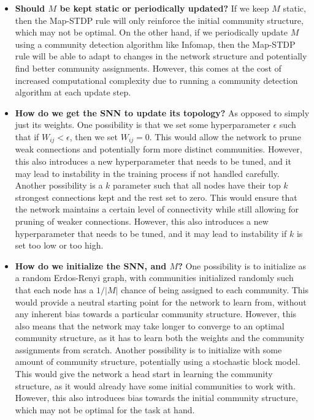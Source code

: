 \documentclass[pdflatex,sn-mathphys-num]{sn-jnl}%
\theoremstyle{thmstyleone}%
\theoremstyle{thmstyletwo}%
\theoremstyle{thmstylethree}%
\begin{document}
\begin{itemize}
    \item \textbf{Should $M$ be kept static or periodically updated?} If we keep $M$ static, then the Map-STDP rule will only reinforce the initial community structure, which may not be optimal. On the other hand, if we periodically update $M$ using a community detection algorithm like Infomap, then the Map-STDP rule will be able to adapt to changes in the network structure and potentially find better community assignments. However, this comes at the cost of increased computational complexity due to running a community detection algorithm at each update step.
    \item \textbf{How do we get the SNN to update its topology?} As opposed to simply just its weights. One possibility is that we set some hyperparameter $\epsilon$ such that if $W_{ij} < \epsilon$, then we set $W_{ij} = 0$. This would allow the network to prune weak connections and potentially form more distinct communities. However, this also introduces a new hyperparameter that needs to be tuned, and it may lead to instability in the training process if not handled carefully. Another possibility is a $k$ parameter such that all nodes have their top $k$ strongest connections kept and the rest set to zero. This would ensure that the network maintains a certain level of connectivity while still allowing for pruning of weaker connections. However, this also introduces a new hyperparameter that needs to be tuned, and it may lead to instability if $k$ is set too low or too high.
    \item \textbf{How do we initialize the SNN, and $M$?} One possibility is to initialize as a random Erdos-Renyi graph, with communities initialized randomly such that each node has a $1/|M|$ chance of being assigned to each community. This would provide a neutral starting point for the network to learn from, without any inherent bias towards a particular community structure. However, this also means that the network may take longer to converge to an optimal community structure, as it has to learn both the weights and the community assignments from scratch. Another possibility is to initialize with some amount of community structure, potentially using a stochastic block model. This would give the network a head start in learning the community structure, as it would already have some initial communities to work with. However, this also introduces bias towards the initial community structure, which may not be optimal for the task at hand.
\end{itemize}
\end{document}
